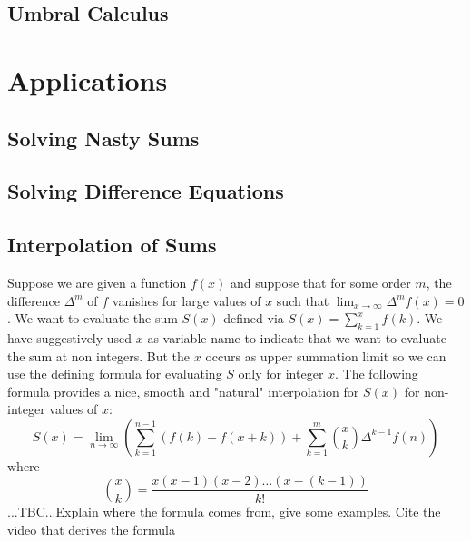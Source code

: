 
\subsection{Umbral Calculus}











\section{Applications}

\subsection{Solving Nasty Sums}

\subsection{Solving Difference Equations}


\subsection{Interpolation of Sums}
Suppose we are given a function $f(x)$ and suppose that for some order $m$, the difference $\Delta^m$ of $f$ vanishes for large values of $x$ such that $\lim_{x \rightarrow \infty} \Delta^m f(x) = 0$. We want to evaluate the sum $S(x)$ defined via $S(x) = \sum_{k=1}^{x} f(k)$. We have suggestively used $x$ as variable name to indicate that we want to evaluate the sum at non integers. But the $x$ occurs as upper summation limit so we can use the defining formula for evaluating $S$ only for integer $x$. The following formula provides a nice, smooth and "natural" interpolation for $S(x)$ for non-integer values of $x$:
\begin{equation}
S(x) = \lim_{n \rightarrow \infty} 
\left(   \sum_{k=1}^{n-1} \left(f(k) - f(x+k) \right) 
       + \sum_{k=1}^{m} \binom{x}{k} \Delta^{k-1} f(n)  \right)
\end{equation}
where
\begin{equation}
\binom{x}{k} = \frac{x (x-1) (x-2) \ldots (x-(k-1)) }{k!}
\end{equation}
...TBC...Explain where the formula comes from, give some examples. Cite the video that derives the formula

